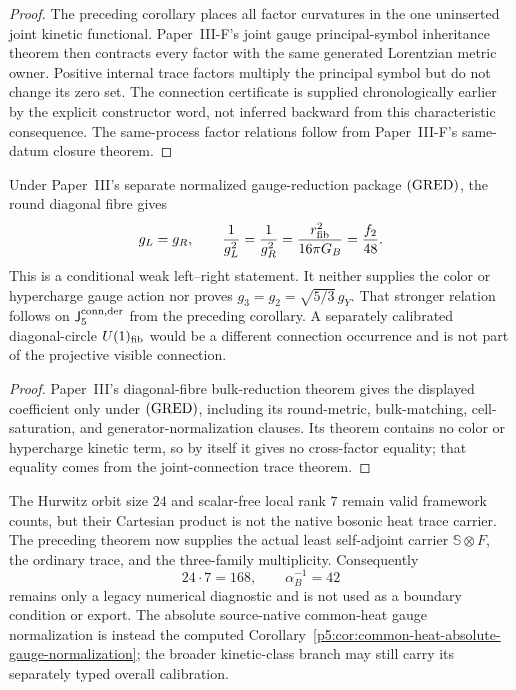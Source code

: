 \documentclass[12pt,a4paper]{article}
\begin{document}
\begin{proof}
The preceding corollary places all factor curvatures in the one uninserted
joint kinetic functional.  Paper~III-F's joint gauge principal-symbol
inheritance theorem then contracts every factor with the same generated
Lorentzian metric owner.  Positive internal trace factors multiply the
principal symbol but do not change its zero set.  The connection certificate
is supplied chronologically earlier by the explicit constructor word, not
inferred backward from this characteristic consequence.  The same-process
factor relations follow from Paper~III-F's same-datum closure theorem.
\end{proof}

\begin{corollary}
\label{p5:cor:born-spherical-left-right-normalization}
Under Paper~III's separate normalized gauge-reduction package
\(({\rm GRED})\), the round diagonal fibre gives
\[
g_L=g_R,
\qquad
\frac1{g_L^2}=\frac1{g_R^2}
=\frac{r_{\rm fib}^2}{16\pi G_B}
=\frac{f_2}{48}.
\]
This is a conditional weak left--right statement.  It neither supplies the
color or hypercharge gauge action nor proves
\(g_3=g_2=\sqrt{5/3}\,g_Y\).  That stronger relation follows on
\(\mathsf J_5^{\rm conn,der}\) from the preceding corollary.  A separately
calibrated diagonal-circle \(U(1)_{\rm fib}\) would be a different connection
occurrence and is not part of the projective visible connection.
\end{corollary}

\begin{proof}
Paper~III's diagonal-fibre bulk-reduction theorem gives the displayed
coefficient only under \(({\rm GRED})\), including its round-metric,
bulk-matching, cell-saturation, and generator-normalization clauses.  Its
theorem contains no color or hypercharge kinetic term, so by itself it gives
no cross-factor equality; that equality comes from the joint-connection trace
theorem.
\end{proof}

\begin{remark}
\label{p5:rem:born-gauge-trace-support}
The Hurwitz orbit size \(24\) and scalar-free local rank \(7\) remain valid
framework counts, but their Cartesian product is not the native bosonic heat
trace carrier.  The preceding theorem now supplies the actual least
self-adjoint carrier \(\mathbb S\otimes F\), the ordinary trace, and the
three-family multiplicity.  Consequently
\[
24\cdot7=168,
\qquad
\alpha_B^{-1}=42
\]
remains only a legacy numerical diagnostic and is not used as a boundary
condition or export.  The absolute source-native common-heat gauge
normalization is instead the computed Corollary~\ref{p5:cor:common-heat-absolute-gauge-normalization}; the broader kinetic-class branch may still carry its separately typed overall calibration.
\end{remark}
\end{document}
